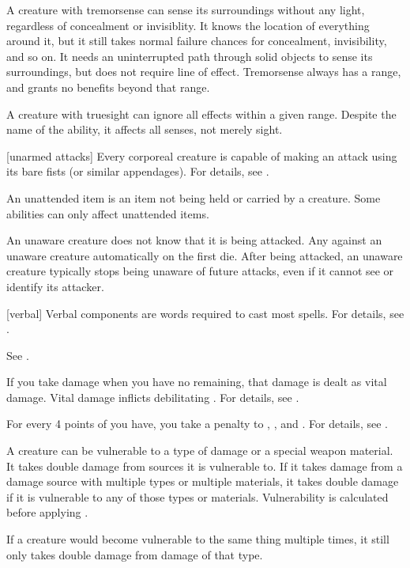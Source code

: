  A creature with tremorsense can sense its surroundings without any light, regardless of concealment or invisiblity.
It knows the location of everything around it, but it still takes normal failure chances for concealment, invisibility, and so on.
It needs an uninterrupted path through solid objects to sense its surroundings, but does not require line of effect.
Tremorsense always has a range, and grants no benefits beyond that range.

 A creature with truesight can ignore all  effects within a given range.
Despite the name of the ability, it affects all senses, not merely sight.

[unarmed attacks] Every corporeal creature is capable of making an attack using its bare fists (or similar appendages).
For details, see .

 An unattended item is an item not being held or carried by a creature.
Some abilities can only affect unattended items.

 An unaware creature does not know that it is being attacked.
Any  against an unaware creature automatically  on the first die.
After being attacked, an unaware creature typically stops being unaware of future attacks, even if it cannot see or identify its attacker.

[verbal] Verbal components are words required to cast most spells.
For details, see .

 See .

 If you take damage when you have no  remaining, that damage is dealt as vital damage.
Vital damage inflicts debilitating .
For details, see .

 For every 4 points of  you have, you take a  penalty to , , and .
For details, see .

 A creature can be vulnerable to a type of damage or a special weapon material.
It takes double damage from sources it is vulnerable to.
If it takes damage from a damage source with multiple types or multiple materials, it takes double damage if it is vulnerable to any of those types or materials.
Vulnerability is calculated before applying .
\par If a creature would become vulnerable to the same thing multiple times, it still only takes double damage from damage of that type.

